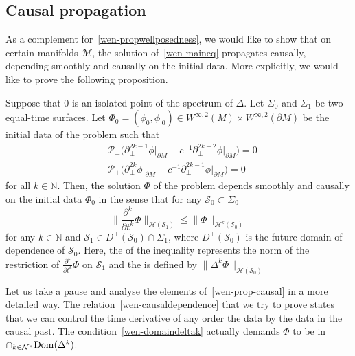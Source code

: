 \subsection{Causal propagation}\label{wen-subsect-causal}
As a complement for~\cref{wen-propwellposedness},
we would like to show that on certain manifolds $\mathcal{M}$, 
the solution of~\cref{wen-maineq} propagates causally, \ie depending smoothly and causally on the initial data.
More explicitly, 
we would like to prove the following proposition.
\begin{proposition}\label{wen-prop-causal}
Suppose that 0 is an isolated point of the spectrum of $\Delta$. 
Let $\Sigma_0$ and $\Sigma_1$ be two equal-time surfaces.
Let $\Phi_0 = (\phi_0, \phi_{|0})\in W^{\infty,2}(M)\times W^{\infty,2}(\partial M)$ be the initial data of the problem such that
\begin{equation}\label{wen-domaindeltak}
\begin{split}
& \mathcal{P}_-\big( \partial_\bot^{2k-1}\phi\vert_{\partial M} - c^{-1}\partial_\bot^{2k-2}\phi\vert_{\partial M}\big) = 0  \\
& \mathcal{P}_+\big( \partial_\bot^{2k}\phi\vert_{\partial M} - c^{-1}\partial_\bot^{2k-1}\phi\vert_{\partial M}\big) =0  
\end{split}
\end{equation}
for all $k\in\mathbb{N}$.
Then, the solution $\Phi$ of the problem depends smoothly and causally on the initial data $\Phi_0$ in the sense that for any $\mathcal{S}_0 \subset \Sigma_0$
\begin{equation}\label{wen-causaldependence}
\big\| \frac{\partial^k}{\partial t^k} \Phi\big\|_{\mathcal{H}(\mathcal{S}_1)}
\leq
\big\| \Phi\big\|_{\mathcal{H}^{k}(\mathcal{S}_0)}
\end{equation}
for any $k\in\mathbb{N}$ and $\mathcal{S}_1 \in D^+(\mathcal{S}_0)\cap\Sigma_1$, where $D^+(\mathcal{S}_0)$ is the future domain of dependence of $\mathcal{S}_0$.
Here, the \rhs of the inequality represents the norm of the restriction of $\frac{\partial^k}{\partial t^k} \Phi$ on $\mathcal{S}_1$ and the \lhs is defined by $\|\Delta^k \Phi\|_{\mathcal{H}(\mathcal{S}_0)}$  
\end{proposition}
Let us take a pause and analyse the elements of~\cref{wen-prop-causal} in a more detailed way.
The relation~\cref{wen-causaldependence} that we try to prove states that we can control the time derivative of any order the data by the data in the causal past.
The condition~\cref{wen-domaindeltak} actually demands $\Phi$ to be in $\cap_{k\in\mathcal{N}^*}\mathrm{Dom}(\Delta^k)$.
